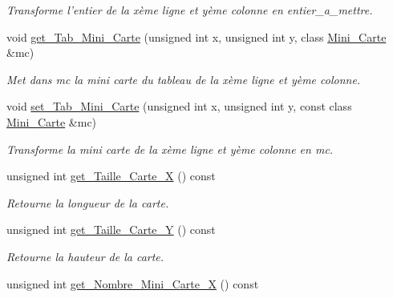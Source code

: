 \begin{DoxyCompactItemize}
\begin{DoxyCompactList}\small\item\em Transforme l'entier de la xème ligne et yème colonne en entier\+\_\+a\+\_\+mettre. \end{DoxyCompactList}\item 
\hypertarget{classCarte_a9421170d4a06210f042763050b993cb4}{void \hyperlink{classCarte_a9421170d4a06210f042763050b993cb4}{get\+\_\+\+Tab\+\_\+\+Mini\+\_\+\+Carte} (unsigned int x, unsigned int y, class \hyperlink{classMini__Carte}{Mini\+\_\+\+Carte} \&mc)}\label{classCarte_a9421170d4a06210f042763050b993cb4}

\begin{DoxyCompactList}\small\item\em Met dans mc la mini carte du tableau de la xème ligne et yème colonne. \end{DoxyCompactList}\item 
\hypertarget{classCarte_a07a8f38a6629e2bfb0f7848d6a2aac79}{void \hyperlink{classCarte_a07a8f38a6629e2bfb0f7848d6a2aac79}{set\+\_\+\+Tab\+\_\+\+Mini\+\_\+\+Carte} (unsigned int x, unsigned int y, const class \hyperlink{classMini__Carte}{Mini\+\_\+\+Carte} \&mc)}\label{classCarte_a07a8f38a6629e2bfb0f7848d6a2aac79}

\begin{DoxyCompactList}\small\item\em Transforme la mini carte de la xème ligne et yème colonne en mc. \end{DoxyCompactList}\item 
\hypertarget{classCarte_a2694daad332a0e9d369a31c7f7e4e07c}{unsigned int \hyperlink{classCarte_a2694daad332a0e9d369a31c7f7e4e07c}{get\+\_\+\+Taille\+\_\+\+Carte\+\_\+\+X} () const }\label{classCarte_a2694daad332a0e9d369a31c7f7e4e07c}

\begin{DoxyCompactList}\small\item\em Retourne la longueur de la carte. \end{DoxyCompactList}\item 
\hypertarget{classCarte_a14ddc1a9a8294814245aeac4617293ed}{unsigned int \hyperlink{classCarte_a14ddc1a9a8294814245aeac4617293ed}{get\+\_\+\+Taille\+\_\+\+Carte\+\_\+\+Y} () const }\label{classCarte_a14ddc1a9a8294814245aeac4617293ed}

\begin{DoxyCompactList}\small\item\em Retourne la hauteur de la carte. \end{DoxyCompactList}\item 
\hypertarget{classCarte_aff4c87f90cfbd3594ecf1e4dead39a4a}{unsigned int \hyperlink{classCarte_aff4c87f90cfbd3594ecf1e4dead39a4a}{get\+\_\+\+Nombre\+\_\+\+Mini\+\_\+\+Carte\+\_\+\+X} () const }\label{classCarte_aff4c87f90cfbd3594ecf1e4dead39a4a}


\end{DoxyCompactItemize}
